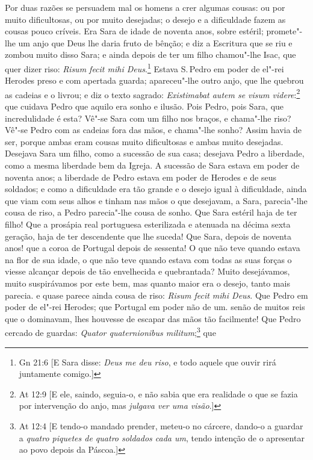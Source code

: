 Por duas razões se persuadem mal os homens a crer algumas cousas: ou por
muito dificultosas, ou por muito desejadas; o desejo e a dificuldade
fazem as cousas pouco críveis. Era Sara de idade de noventa anos, sobre
estéril; promete"-lhe um anjo que Deus lhe daria fruto de bênção; e diz a
Escritura que se riu e zombou muito disso Sara; e ainda depois de ter um
filho chamou"-lhe Isac, que quer dizer riso: \emph{Risum fecit mihi
Deus}.\footnote{Gn 21:6 [E Sara disse: \textit{Deus me deu riso}, e todo aquele que ouvir rirá juntamente comigo.]} Estava S.\,Pedro em poder de el"-rei Herodes preso e com apertada
guarda; apareceu"-lhe outro anjo, que lhe quebrou as cadeias e o livrou;
e diz o texto sagrado: \emph{Existimabat autem se visum videre}:\footnote{At 12:9 [E ele, saindo, seguia-o, e não sabia que era realidade o que se fazia por intervenção do anjo, mas \textit{julgava ver uma visão}.]} que
cuidava Pedro que aquilo era sonho e ilusão. Pois Pedro, pois Sara,
que incredulidade é esta? Vê"-se Sara com um filho nos braços, e
chama"-lhe riso? Vê"-se Pedro com as cadeias fora das mãos, e chama"-lhe
sonho? Assim havia de ser, porque ambas eram cousas muito
dificultosas e ambas muito desejadas. Desejava Sara um filho, como a
sucessão de sua casa; desejava Pedro a liberdade, como a mesma liberdade
bem da Igreja. A sucessão de Sara estava em poder de noventa anos; a
liberdade de Pedro estava em poder de Herodes e de seus soldados; e como
a dificuldade era tão grande e o desejo igual à dificuldade, ainda que
viam com seus alhos e tinham nas mãos o que desejavam, a Sara,
parecia"-lhe cousa de riso, a Pedro parecia"-lhe cousa de sonho. Que Sara
estéril haja de ter filho! Que a prosápia real portuguesa esterilizada e
atenuada na décima sexta geração, haja de ter descendente que lhe
suceda! Que Sara, depois de noventa anos! que a coroa de Portugal
depois de sessenta! O que não teve quando estava na flor de sua idade, o que não
teve quando estava com todas as suas forças o viesse alcançar depois de
tão envelhecida e quebrantada? Muito desejávamos, muito suspirávamos por
este bem, mas quanto maior era o desejo, tanto mais parecia. e quase parece ainda
cousa de riso: \emph{Risum fecit mihi Deus}. Que Pedro em poder de
el"-rei Herodes; que Portugal em poder não de um. senão de muitos reis
que o dominavam, lhes houvesse de escapar das mãos tão facilmente! Que
Pedro cercado de guardas: \emph{Quator quaternionibus militum};\footnote{At 12:4 [E tendo-o mandado prender, meteu-o no cárcere, dando-o a guardar a \textit{quatro piquetes de quatro soldados cada um}, tendo intenção de o apresentar ao povo depois da Páscoa.]} que
